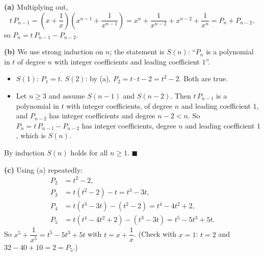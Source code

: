 \textbf{(a)} Multiplying out,
\[t\,P_{n-1}=\left(x+\dfrac1x\right)\left(x^{n-1}+\dfrac{1}{x^{n-1}}\right)=x^n+\dfrac{1}{x^{n-2}}+x^{n-2}+\dfrac{1}{x^n}=P_n+P_{n-2},\]
so $P_n=t\,P_{n-1}-P_{n-2}$.

\textbf{(b)} We use strong induction on $n$; the statement is $S(n)$: ``$P_n$ is a polynomial in $t$ of degree $n$ with integer coefficients and leading coefficient $1$''.
\begin{itemize}
\item $S(1)$: $P_1=t$. $S(2)$: by (a), $P_2=t\cdot t-2=t^2-2$. Both are true.
\item Let $n\ge3$ and assume $S(n-1)$ and $S(n-2)$. Then $t\,P_{n-1}$ is a polynomial in $t$ with integer coefficients, of degree $n$ and leading coefficient $1$, and $P_{n-2}$ has integer coefficients and degree $n-2<n$. So $P_n=t\,P_{n-1}-P_{n-2}$ has integer coefficients, degree $n$ and leading coefficient $1$, which is $S(n)$.
\end{itemize}
By induction $S(n)$ holds for all $n\ge1$. $\blacksquare$

\textbf{(c)} Using (a) repeatedly:
\begin{align*}
P_2&=t^2-2,\\
P_3&=t\left(t^2-2\right)-t=t^3-3t,\\
P_4&=t\left(t^3-3t\right)-\left(t^2-2\right)=t^4-4t^2+2,\\
P_5&=t\left(t^4-4t^2+2\right)-\left(t^3-3t\right)=t^5-5t^3+5t.
\end{align*}
So $\boxed{x^5+\dfrac{1}{x^5}=t^5-5t^3+5t}$ with $t=x+\dfrac1x$. (Check with $x=1$: $t=2$ and $32-40+10=2=P_5$.)
